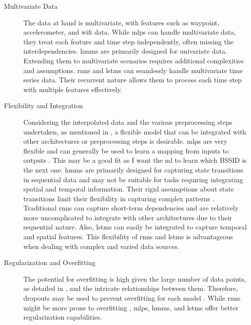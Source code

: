 \begin{description}
\item [Multivariate Data]
The data at hand is multivariate, with features such as waypoint, accelerometer, and \ac{wifi} data.
While \acp{mlp} can handle multivariate data, they treat each feature and time step independently, often missing the interdependencies.
\acp{hmm} are primarily designed for univariate data. Extending them to multivariate scenarios requires additional complexities and assumptions.
\acp{rnn} and \acp{lstm} can seamlessly handle multivariate time series data. 
Their recurrent nature allows them to process each time step with multiple features effectively.
\end{description}

\begin{description}
\item[Flexibility and Integration]
Considering the interpolated data and the various preprocessing steps undertaken, as mentioned in , a flexible model that can be integrated with other architectures or preprocessing steps is desirable. 
\acp{mlp} are very flexible and can generally be used to learn a mapping from inputs to outputs \cite{mlp-vs-cnn-vs-rnn}.
This may be a good fit as I want the \ac{ml} to learn which BSSID is the next one.
\acp{hmm} are primarily designed for capturing state transitions in sequential data and may not be suitable for tasks requiring integrating spatial and temporal information.
Their rigid assumptions about state transitions limit their flexibility in capturing complex patterns \cite{hmm-rabiner-1989}.
Traditional \acp{rnn} can capture short-term dependencies and are relatively more uncomplicated to integrate with other architectures due to their sequential nature.
Also, \acp{lstm} can easily be integrated to capture temporal and spatial features. 
This flexibility of \acp{rnn} and \acp{lstm} is advantageous when dealing with complex and varied data sources.
\end{description}

\begin{description}
\item[Regularization and Overfitting]
The potential for overfitting is high given the large number of data points, as detailed in , and the intricate relationships between them.
Therefore, dropouts may be used to prevent overfitting for each model \cite{srivastava14a}.
While \acp{rnn} might be more prone to overfitting \cite{rnn_difficulties_2013}, \acp{mlp}, \acp{hmm}, and \acp{lstm} offer better regularization capabilities.
\end{description}

